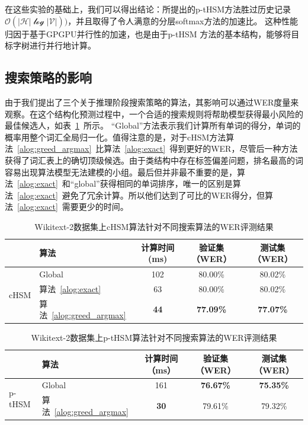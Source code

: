 在这些实验的基础上，我们可以得出结论：所提出的p-tHSM方法胜过历史记录$ \mathcal{O(| H | \log| V |)})$，并且取得了令人满意的分层softmax方法的加速比。 这种性能归因于基于GPGPU并行性的加速，也是由于p-tHSM 方法的基本结构，能够将目标字树进行并行地计算。


\subsection{搜索策略的影响}
由于我们提出了三个关于推理阶段搜索策略的算法，其影响可以通过WER度量来观察。在这个结构化预测过程中，一个合适的搜索规则将帮助模型获得最小风险的最佳候选人，如表~\ref{tab:search}~所示。 “Global”方法表示我们计算所有单词的得分，单词的概率用整个词汇全局归一化。值得注意的是，对于cHSM方法算法~\ref{alog:greed_argmax}~比算法~\ref{alog:exact}~得到更好的WER，尽管后一种方法获得了词汇表上的确切顶级候选。由于类结构中存在标签偏差问题，排名最高的词容易出现算法模型无法建模的小组。最后但并非最不重要的是，算法~\ref{alog:exact}~和``global''获得相同的单词排序，唯一的区别是算法~\ref{alog:exact}~避免了冗余计算。所以他们达到了可比的WER得分，但算法~\ref{alog:exact}~需要更少的时间。
\begin{table}[!ht]
  \centering
  \caption{Wikitext-2数据集上cHSM算法针对不同搜索算法的WER评测结果\label{tab:search}}
\begin{tabular}{llccc}
  \toprule
   & 算法&计算时间 (ms)&验证集（WER）& 测试集（WER）\\ \midrule
  \multirow{3}{*}{cHSM} &Global&102& 80.00\%& 80.02\%\\
        &算法~\ref{alog:exact}&63& 80.00\%& 80.02\%\\
        &算法~\ref{alog:greed_argmax}&\textbf{44}&\textbf{ 77.09\%}&\textbf{ 77.07\%}\\
  \bottomrule
\end{tabular}
\end{table}

\begin{table}[!ht]
  \centering
  \caption{Wikitext-2数据集上p-tHSM算法针对不同搜索算法的WER评测结果\label{tab:psearch2}}
\begin{tabular}{llccc}
  \toprule
        & 算法&计算时间（ms）&验证集（WER）& 测试集（WER）\\ \midrule
  \multirow{2}{*}{p-tHSM}  &Global&161& \textbf{76.67\%}&\textbf{75.35\%}\\
        &算法~\ref{alog:greed_argmax}&\textbf{30} & 79.61\%&79.32\%\\
  \bottomrule
\end{tabular}
\end{table}

